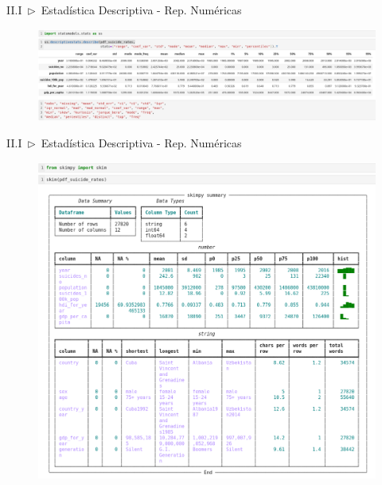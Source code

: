 \documentclass[xcolor=dvipsnames]{beamer}
\begin{document}
    \begin{frame}{II.I~$\rhd$~Estadística Descriptiva - Rep. Numéricas}
        \begin{figure}
            \centering
            \includegraphics[width=\linewidth]{imgs/t1_img3.png}
        \end{figure}
    \end{frame}

    \begin{frame}{II.I~$\rhd$~Estadística Descriptiva - Rep. Numéricas}
        \begin{figure}
            \centering
            \includegraphics[width=0.7\linewidth]{imgs/t1_img2.png}
        \end{figure}
    \end{frame}
\end{document}
